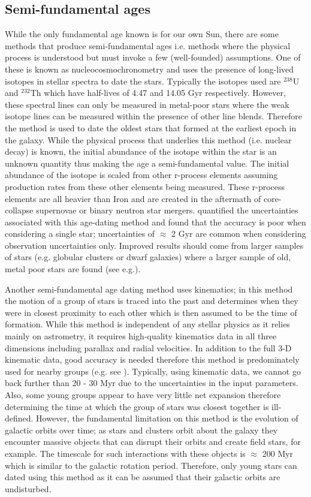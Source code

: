 \subsection{Semi-fundamental ages}
While the only fundamental age known is for our own Sun, there are some methods that produce semi-fundamental ages i.e. methods where the physical process is understood but must invoke a few (well-founded) assumptions. One of these is known as nucleocosmochronometry and uses the presence of long-lived isotopes in stellar spectra to date the stars. Typically the isotopes used are $^{238}$U and $^{232}$Th which have half-lives of 4.47 and 14.05 Gyr respectively. However, these spectral lines can only be measured in metal-poor stars where the weak isotope lines can be measured within the presence of other line blends. Therefore the method is used to date the oldest stars that formed at the earliest epoch in the galaxy. While the physical process that underlies this method (i.e. nuclear decay) is known, the initial abundance of the isotope within the star is an unknown quantity thus making the age a semi-fundamental value. The initial abundance of the isotope is scaled from other r-process elements assuming production rates from these other elements being measured. These r-process elements are all heavier than Iron and are created in the aftermath of core-collapse supernovae or binary neutron star mergers. \citet{Ludwig_etal_2010} quantified the uncertainties associated with this age-dating method and found that the accuracy is poor when considering a single star; uncertainties of $\approx$ 2 Gyr are common when considering observation uncertainties only. Improved results should come from larger samples of stars (e.g. globular clusters or dwarf galaxies) where a larger sample of old, metal poor stars are found (see e.g.\citealt{Hansen_etal_2018}). 

Another semi-fundamental age dating method uses kinematics; in this method the motion of a group of stars is traced into the past and determines when they were in closest proximity to each other which is then assumed to be the time of formation. While this method is independent of any stellar physics as it relies mainly on astrometry, it requires high-quality kinematics data in all three dimensions including parallax and radial velocities. In addition to the full 3-D kinematic data, good accuracy is needed therefore this method is predominately used for nearby groups (e.g. see \citealt{Makarov_2007}). Typically, using kinematic data, we cannot go back further than 20 - 30 Myr due to the uncertainties in the input parameters. Also, some young groups appear to have very little net expansion \citep{Mamajek_2005} therefore determining the time at which the group of stars was closest together is ill-defined. However, the fundamental limitation on this method is the evolution of galactic orbits over time; as stars and clusters orbit about the galaxy they encounter massive objects that can disrupt their orbits and create field stars, for example. The timescale for such interactions with these objects is $\approx$ 200 Myr \citep{Janes_Phelps_1994} which is similar to the galactic rotation period. Therefore, only young stars can dated using this method as it can be assumed that their galactic orbits are undisturbed.

